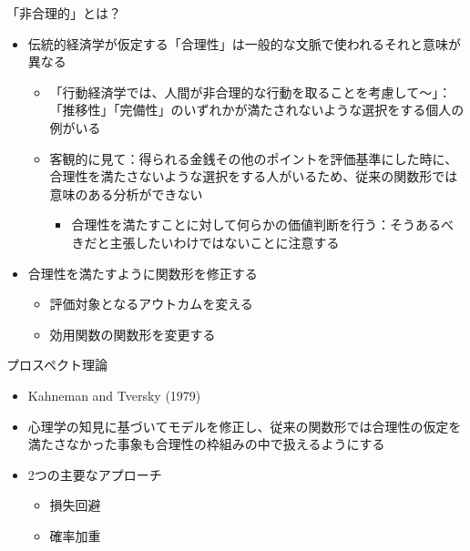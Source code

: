 \documentclass[dvipdfmx,11pt]{beamer}
\begin{document}
\begin{frame}{「非合理的」とは？}
  \begin{itemize}
    \item 伝統的経済学が仮定する「合理性」は一般的な文脈で使われるそれと意味が異なる
    \begin{itemize}
      \item 「行動経済学では、人間が非合理的な行動を取ることを考慮して～」：「推移性」「完備性」のいずれかが満たされないような選択をする個人の例がいる
      \item 客観的に見て：得られる金銭その他のポイントを評価基準にした時に、合理性を満たさないような選択をする人がいるため、従来の関数形では意味のある分析ができない
      \begin{itemize}
        \item 合理性を満たすことに対して何らかの価値判断を行う：そうあるべきだと主張したいわけではないことに注意する
      \end{itemize}
    \end{itemize}
    \item 合理性を満たすように関数形を修正する
    \begin{itemize}
      \item 評価対象となるアウトカムを変える
      \item 効用関数の関数形を変更する
    \end{itemize}
  \end{itemize}
\end{frame}

\begin{frame}{プロスペクト理論}
  \begin{itemize}
    \item Kahneman and Tversky (1979)
    \item 心理学の知見に基づいてモデルを修正し、従来の関数形では合理性の仮定を満たさなかった事象も合理性の枠組みの中で扱えるようにする
    \item 2つの主要なアプローチ
    \begin{itemize}
      \item 損失回避
      \item 確率加重
    \end{itemize}
  \end{itemize}
\end{frame}
\end{document}
